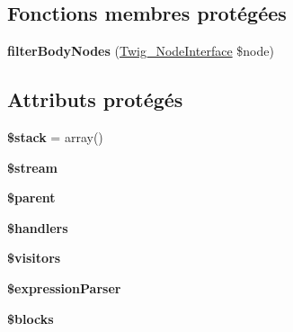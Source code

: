 \subsection*{Fonctions membres protégées}
\begin{DoxyCompactItemize}
\item 
{\bfseries filter\+Body\+Nodes} (\hyperlink{interface_twig___node_interface}{Twig\+\_\+\+Node\+Interface} \$node)\hypertarget{class_twig___parser_a230d5cb9ac5750b23c9228539ded64fb}{}\label{class_twig___parser_a230d5cb9ac5750b23c9228539ded64fb}

\end{DoxyCompactItemize}
\subsection*{Attributs protégés}
\begin{DoxyCompactItemize}
\item 
{\bfseries \$stack} = array()\hypertarget{class_twig___parser_a6a0169b26b5301f906b1ec481b3f1eea}{}\label{class_twig___parser_a6a0169b26b5301f906b1ec481b3f1eea}

\item 
{\bfseries \$stream}\hypertarget{class_twig___parser_aa658946a5d6cb700e35df1fc7854e7b3}{}\label{class_twig___parser_aa658946a5d6cb700e35df1fc7854e7b3}

\item 
{\bfseries \$parent}\hypertarget{class_twig___parser_a4e2313a4b35b72a06ac45fd38960f677}{}\label{class_twig___parser_a4e2313a4b35b72a06ac45fd38960f677}

\item 
{\bfseries \$handlers}\hypertarget{class_twig___parser_ac01af86047396c863ebae81b8c8f7427}{}\label{class_twig___parser_ac01af86047396c863ebae81b8c8f7427}

\item 
{\bfseries \$visitors}\hypertarget{class_twig___parser_a63a73490fa0428629a602fd9042a95aa}{}\label{class_twig___parser_a63a73490fa0428629a602fd9042a95aa}

\item 
{\bfseries \$expression\+Parser}\hypertarget{class_twig___parser_a85cec3fd7a755262bc0d41009c83027e}{}\label{class_twig___parser_a85cec3fd7a755262bc0d41009c83027e}

\item 
{\bfseries \$blocks}\hypertarget{class_twig___parser_a320aeae1df42ee73ab4b3d9f7cf4ef3f}{}\label{class_twig___parser_a320aeae1df42ee73ab4b3d9f7cf4ef3f}


\end{DoxyCompactItemize}
